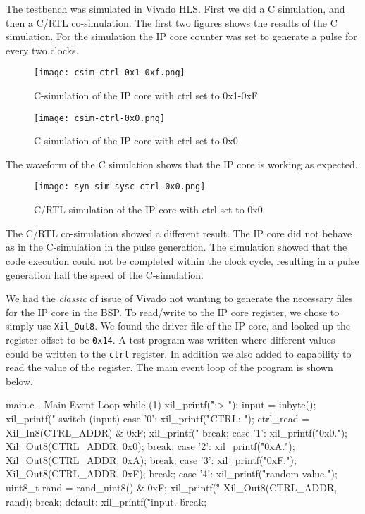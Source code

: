 \documentclass[../main.tex]{subfiles}
\begin{document}
\newpage
The testbench was simulated in Vivado HLS. First we did a C simulation, and then a C/RTL co-simulation. The first two figures shows the results of the C simulation.
For the simulation the IP core counter was set to generate a pulse for every two clocks. 
\begin{figure}[h]
    \centering
    \texttt{[image: csim-ctrl-0x1-0xf.png]}
    \caption{C-simulation of the IP core with ctrl set to 0x1-0xF}
\end{figure}

\begin{figure}[h]
    \centering
    \texttt{[image: csim-ctrl-0x0.png]}
    \caption{C-simulation of the IP core with ctrl set to 0x0}
\end{figure}
\par
The waveform of the C simulation shows that the IP core is working as expected.

\begin{figure}[h]
    \centering
    \texttt{[image: syn-sim-sysc-ctrl-0x0.png]}
    \caption{C/RTL simulation of the IP core with ctrl set to 0x0}
\end{figure}

The C/RTL co-simulation showed a different result. The IP core did not behave as in the C-simulation in the pulse generation. 
The simulation showed that the code execution could not be completed within the clock cycle, resulting in a pulse generation half the speed of the C-simulation.

\newpage

We had the \textit{classic} of issue of Vivado not wanting to generate the necessary files for the IP core in the BSP. To read/write to the IP core register, we chose to simply use \texttt{Xil\_Out8}. We found the driver file of the IP core, and looked up the register offset to be \texttt{0x14}. A test program was written where different values could be written to the \texttt{ctrl} register. In addition we also added to capability to read the value of the register. The main event loop of the program is shown below.

\begin{myminted}{main.c - Main Event Loop}
while (1)
{
    xil_printf("\r\n\nCMD:> ");
    input = inbyte();
    xil_printf("%
    switch (input)
    {
        case '0':
            xil_printf("\r\nReading CTRL: ");
            ctrl_read = Xil_In8(CTRL_ADDR) & 0xF;
            xil_printf("%
            break;
        case '1':
            xil_printf("\r\nWriting 0x0.");
            Xil_Out8(CTRL_ADDR, 0x0);
            break;
        case '2':
            xil_printf("\r\nWriting 0xA.");
            Xil_Out8(CTRL_ADDR, 0xA);
            break;
        case '3':
            xil_printf("\r\nWriting 0xF.");
            Xil_Out8(CTRL_ADDR, 0xF);
            break;
        case '4':
            xil_printf("\r\nGenerating random value.");
            uint8_t rand = rand_uint8() & 0xF;
            xil_printf("\r\nWriting %
            Xil_Out8(CTRL_ADDR, rand);
            break;
        default:
            xil_printf("\r\nUnrecognized input. \"%
            break;
    }
}
\end{myminted}
\end{document}
